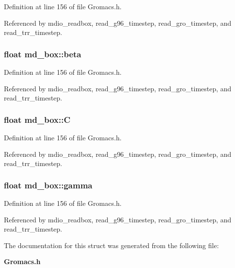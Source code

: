 Definition at line 156 of file Gromacs.h.

Referenced by mdio\_\-readbox, read\_\-g96\_\-timestep, read\_\-gro\_\-timestep, and read\_\-trr\_\-timestep.
\subsubsection{\setlength{\rightskip}{0pt plus 5cm}float md\_\-box::beta}\label{structmd__box_m4}




Definition at line 156 of file Gromacs.h.

Referenced by mdio\_\-readbox, read\_\-g96\_\-timestep, read\_\-gro\_\-timestep, and read\_\-trr\_\-timestep.
\subsubsection{\setlength{\rightskip}{0pt plus 5cm}float md\_\-box::C}\label{structmd__box_m2}




Definition at line 156 of file Gromacs.h.

Referenced by mdio\_\-readbox, read\_\-g96\_\-timestep, read\_\-gro\_\-timestep, and read\_\-trr\_\-timestep.
\subsubsection{\setlength{\rightskip}{0pt plus 5cm}float md\_\-box::gamma}\label{structmd__box_m5}




Definition at line 156 of file Gromacs.h.

Referenced by mdio\_\-readbox, read\_\-g96\_\-timestep, read\_\-gro\_\-timestep, and read\_\-trr\_\-timestep.

The documentation for this struct was generated from the following file:\begin{CompactItemize}
\item 
{\bf Gromacs.h}\end{CompactItemize}
